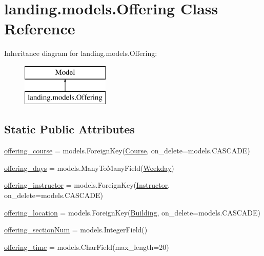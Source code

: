 \hypertarget{classlanding_1_1models_1_1Offering}{}\section{landing.\+models.\+Offering Class Reference}
\label{classlanding_1_1models_1_1Offering}
Inheritance diagram for landing.\+models.\+Offering\+:\begin{figure}[H]
\begin{center}
\leavevmode
\includegraphics[height=2.000000cm]{classlanding_1_1models_1_1Offering}
\end{center}
\end{figure}
\subsection*{Static Public Attributes}
\begin{DoxyCompactItemize}
\item 
\mbox{\hyperlink{classlanding_1_1models_1_1Offering_a61ee20a63d849a004c9aaa3b8aa00a42}{offering\+\_\+course}} = models.\+Foreign\+Key(\mbox{\hyperlink{classlanding_1_1models_1_1Course}{Course}}, on\+\_\+delete=models.\+C\+A\+S\+C\+A\+DE)
\item 
\mbox{\hyperlink{classlanding_1_1models_1_1Offering_a2680068b2c5f2feb7fe159f59a642d20}{offering\+\_\+days}} = models.\+Many\+To\+Many\+Field(\mbox{\hyperlink{classlanding_1_1models_1_1Weekday}{Weekday}})
\item 
\mbox{\hyperlink{classlanding_1_1models_1_1Offering_a40e7638869d600e27b2d8395f2c0a56b}{offering\+\_\+instructor}} = models.\+Foreign\+Key(\mbox{\hyperlink{classlanding_1_1models_1_1Instructor}{Instructor}}, on\+\_\+delete=models.\+C\+A\+S\+C\+A\+DE)
\item 
\mbox{\hyperlink{classlanding_1_1models_1_1Offering_a4f1b030e6eaefa7b1c869621b4a37f61}{offering\+\_\+location}} = models.\+Foreign\+Key(\mbox{\hyperlink{classlanding_1_1models_1_1Building}{Building}}, on\+\_\+delete=models.\+C\+A\+S\+C\+A\+DE)
\item 
\mbox{\hyperlink{classlanding_1_1models_1_1Offering_a89639b4a5b945918bb4f8a4c08cf8247}{offering\+\_\+section\+Num}} = models.\+Integer\+Field()
\item 
\mbox{\hyperlink{classlanding_1_1models_1_1Offering_a546aca2445d9fabd2dac01b7230f93f5}{offering\+\_\+time}} = models.\+Char\+Field(max\+\_\+length=20)
\end{DoxyCompactItemize}


